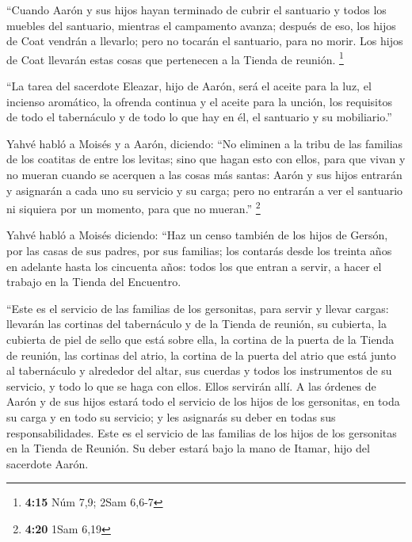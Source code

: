 \begin{paracol}{2}
 ``Cuando Aarón y sus hijos hayan terminado de cubrir el
santuario y todos los muebles del santuario, mientras el campamento
avanza; después de eso, los hijos de Coat vendrán a llevarlo; pero no
tocarán el santuario, para no morir. Los hijos de Coat llevarán estas
cosas que pertenecen a la Tienda de reunión. \footnote{\textbf{4:15} Núm
  7,9; 2Sam 6,6-7}

 ``La tarea del sacerdote Eleazar, hijo de Aarón, será el
aceite para la luz, el incienso aromático, la ofrenda continua y el
aceite para la unción, los requisitos de todo el tabernáculo y de todo
lo que hay en él, el santuario y su mobiliario.''

 Yahvé habló a Moisés y a Aarón, diciendo:
 ``No eliminen a la tribu de las familias de los coatitas
de entre los levitas;  sino que hagan esto con ellos,
para que vivan y no mueran cuando se acerquen a las cosas más santas:
Aarón y sus hijos entrarán y asignarán a cada uno su servicio y su
carga;  pero no entrarán a ver el santuario ni siquiera
por un momento, para que no mueran.'' \footnote{\textbf{4:20} 1Sam 6,19}

 Yahvé habló a Moisés diciendo:  ``Haz un
censo también de los hijos de Gersón, por las casas de sus padres, por
sus familias;  los contarás desde los treinta años en
adelante hasta los cincuenta años: todos los que entran a servir, a
hacer el trabajo en la Tienda del Encuentro.

 ``Este es el servicio de las familias de los gersonitas,
para servir y llevar cargas:  llevarán las cortinas del
tabernáculo y de la Tienda de reunión, su cubierta, la cubierta de piel
de sello que está sobre ella, la cortina de la puerta de la Tienda de
reunión,  las cortinas del atrio, la cortina de la puerta
del atrio que está junto al tabernáculo y alrededor del altar, sus
cuerdas y todos los instrumentos de su servicio, y todo lo que se haga
con ellos. Ellos servirán allí.  A las órdenes de Aarón y
de sus hijos estará todo el servicio de los hijos de los gersonitas, en
toda su carga y en todo su servicio; y les asignarás su deber en todas
sus responsabilidades.  Este es el servicio de las
familias de los hijos de los gersonitas en la Tienda de Reunión. Su
deber estará bajo la mano de Itamar, hijo del sacerdote Aarón.


\end{paracol}
